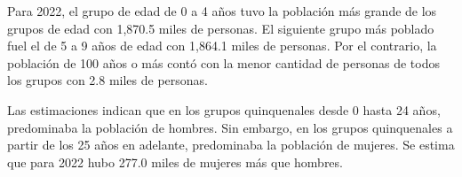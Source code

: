 Para 2022, el grupo de edad de 0 a 4 años tuvo la población más grande de los grupos de edad con 1,870.5 miles de personas. El siguiente grupo más poblado fuel el de 5 a 9 años de edad con 1,864.1 miles de personas. Por el contrario,  la población de 100 años o más contó con la menor cantidad de personas de todos los grupos con 2.8 miles de personas. 

Las estimaciones indican que en los grupos quinquenales desde 0 hasta 24 años, predominaba la población de hombres. Sin embargo, en los grupos quinquenales a partir de los 25 años en adelante, predominaba la población de mujeres. Se estima que para 2022 hubo 277.0 miles de mujeres más que hombres.